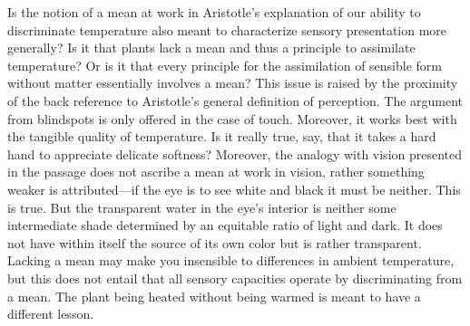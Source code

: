 Is the notion of a mean at work in Aristotle's explanation of our ability to discriminate temperature also meant to characterize sensory presentation more generally? Is it that plants lack a mean and thus a principle to assimilate temperature? Or is it that every principle for the assimilation of sensible form without matter essentially involves a mean? This issue is raised by the proximity of the back reference to Aristotle's general definition of perception. The argument from blindspots is only offered in the case of touch. Moreover, it works best with the tangible quality of temperature. Is it really true, say, that it takes a hard hand to appreciate delicate softness? Moreover, the analogy with vision presented in the passage does not ascribe a mean at work in vision, rather something weaker is attributed---if the eye is to see white and black it must be neither. This is true. But the transparent water in the eye's interior is neither some intermediate shade determined by an equitable ratio of light and dark. It does not have within itself the source of its own color but is rather transparent. Lacking a mean may make you insensible to differences in ambient temperature, but this does not entail that all sensory capacities operate by discriminating from a mean. The plant being heated without being warmed is meant to have a different lesson.

